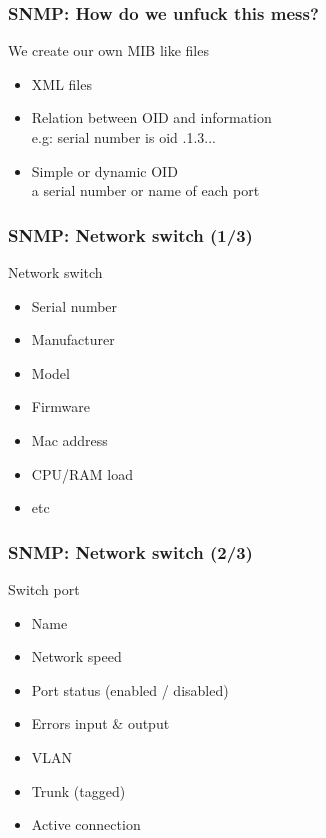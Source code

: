 \documentclass{beamer}
\begin{document}
\begin{frame}
    \frametitle{SNMP: How do we unfuck this mess?}

    \begin{block}{We create our own MIB like files}
    \begin{itemize}
    \item XML files 
    \item Relation between OID and information \\
        \small{e.g: serial number is oid .1.3...}
    \item Simple or dynamic OID \\
        \small{a serial number or name of each port}
    \end{itemize}
    \end{block}


\end{frame}

\begin{frame}
    \frametitle{SNMP: Network switch (1/3)}

    \begin{block}{Network switch}
    \begin{itemize}
    \item Serial number
    \item Manufacturer
    \item Model
    \item Firmware
    \item Mac address    
    \item CPU/RAM load
    \item etc
    \end{itemize}
    \end{block}
\end{frame}

\begin{frame}
    \frametitle{SNMP: Network switch (2/3)}

    \begin{block}{Switch port}
    \begin{itemize}
    \item Name
    \item Network speed
    \item Port status (enabled / disabled)
    \item Errors input \& output
    \item VLAN
    \item Trunk (tagged)
    \item Active connection
    \end{itemize}
    \end{block}
\end{frame}
\end{document}
